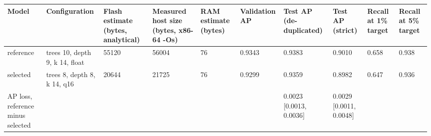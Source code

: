 \begin{tabular}{llllllllll}
\toprule
Model & Configuration & Flash estimate (bytes, analytical) & Measured host size (bytes, x86-64 -Os) & RAM estimate (bytes) & Validation AP & Test AP (de-duplicated) & Test AP (strict) & Recall at 1\% target & Recall at 5\% target \\
\midrule
reference & trees 10, depth 9, k 14, float & 55120 & 56004 & 76 & 0.9343 & 0.9383 & 0.9010 & 0.658 & 0.938 \\
selected & trees 8, depth 8, k 14, q16 & 20644 & 21725 & 76 & 0.9299 & 0.9359 & 0.8982 & 0.647 & 0.936 \\
AP loss, reference minus selected &  &  &  &  &  & 0.0023 [0.0013, 0.0036] & 0.0029 [0.0011, 0.0048] &  &  \\
\bottomrule
\end{tabular}

